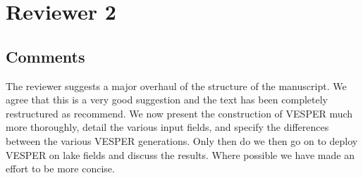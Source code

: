 \documentclass[10pt]{article}
\begin{document}
\newpage 
\section{Reviewer 2}

\subsection*{Comments}
The reviewer suggests a major overhaul of the structure of the manuscript. We agree that this is a very good suggestion and the text has been completely restructured as recommend. We now present the construction of VESPER much more thoroughly, detail the various input fields, and specify the differences between the various VESPER generations.  Only then do we then go on to deploy VESPER on lake fields and discuss the results. Where possible we have made an effort to be more concise. 
\end{document}
